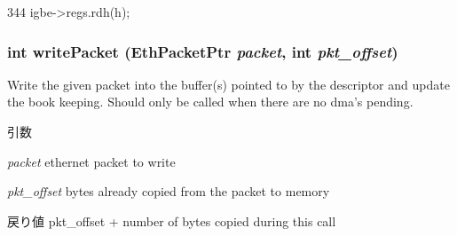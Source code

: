 \begin{DoxyCode}
344 { igbe->regs.rdh(h); }
\end{DoxyCode}
\hypertarget{classIGbE_1_1RxDescCache_a3e213f353f926628fed12519b96f1b47}{
\subsubsection[{writePacket}]{\setlength{\rightskip}{0pt plus 5cm}int writePacket ({\bf EthPacketPtr} {\em packet}, \/  int {\em pkt\_\-offset})}}
\label{classIGbE_1_1RxDescCache_a3e213f353f926628fed12519b96f1b47}
Write the given packet into the buffer(s) pointed to by the descriptor and update the book keeping. Should only be called when there are no dma's pending. 
\begin{DoxyParams}{引数}
\item[{\em packet}]ethernet packet to write \item[{\em pkt\_\-offset}]bytes already copied from the packet to memory \end{DoxyParams}
\begin{DoxyReturn}{戻り値}
pkt\_\-offset + number of bytes copied during this call 
\end{DoxyReturn}



